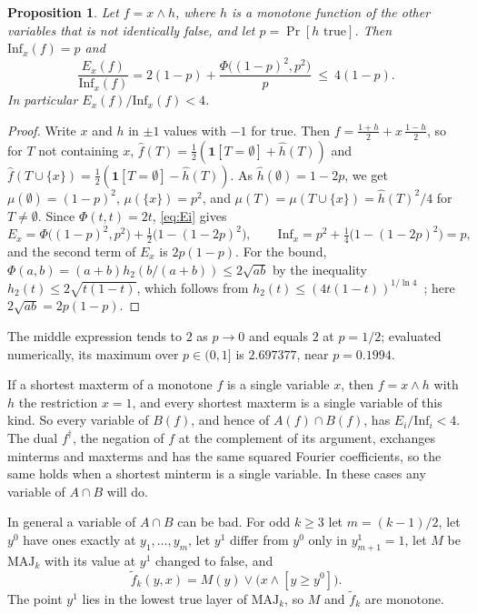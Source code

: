 \documentclass[11pt]{amsart}
\newtheorem{proposition}[theorem]{Proposition}
\theoremstyle{remark}
\newcommand{\Inf}{\mathrm{Inf}}
\newcommand{\MAJ}{\mathrm{MAJ}}
\begin{document}
\begin{proposition}\label{prop:xand}
Let $f=x\wedge h$, where $h$ is a monotone function of the other variables that is not identically false, and let
$p=\Pr[h\text{ true}]$. Then $\Inf_x(f)=p$ and
\[
\frac{E_x(f)}{\Inf_x(f)}=2(1-p)+\frac{\Phi\bigl((1-p)^2,p^2\bigr)}{p}\ \le\ 4(1-p).
\]
In particular $E_x(f)/\Inf_x(f)<4$.
\end{proposition}

\begin{proof}
Write $x$ and $h$ in $\pm1$ values with $-1$ for true. Then $f=\frac{1+h}2+x\,\frac{1-h}2$, so for $T$ not containing
$x$, $\hat f(T)=\frac12(\mathbf 1[T=\emptyset]+\hat h(T))$ and $\hat f(T\cup\{x\})=\frac12(\mathbf
1[T=\emptyset]-\hat h(T))$. As $\hat h(\emptyset)=1-2p$, we get $\mu(\emptyset)=(1-p)^2$, $\mu(\{x\})=p^2$, and
$\mu(T)=\mu(T\cup\{x\})=\hat h(T)^2/4$ for $T\ne\emptyset$. Since $\Phi(t,t)=2t$, \eqref{eq:Ei} gives
\[
E_x=\Phi\bigl((1-p)^2,p^2\bigr)+\tfrac12\bigl(1-(1-2p)^2\bigr),\qquad \Inf_x=p^2+\tfrac14\bigl(1-(1-2p)^2\bigr)=p,
\]
and the second term of $E_x$ is $2p(1-p)$. For the bound, $\Phi(a,b)=(a+b)h_2(b/(a+b))\le2\sqrt{ab}$ by the
inequality $h_2(t)\le2\sqrt{t(1-t)}$, which follows from $h_2(t)\le(4t(1-t))^{1/\ln4}$~\cite{Top}; here
$2\sqrt{ab}=2p(1-p)$.
\end{proof}

The middle expression tends to $2$ as $p\to0$ and equals $2$ at $p=1/2$; evaluated numerically, its maximum over
$p\in(0,1]$ is $2.697377$, near $p=0.1994$.

If a shortest maxterm of a monotone $f$ is a single variable $x$, then $f=x\wedge h$ with $h$ the restriction $x=1$,
and every shortest maxterm is a single variable of this kind. So every variable of $B(f)$, and hence of $A(f)\cap B(f)$,
has $E_i/\Inf_i<4$. The dual $f^\dagger$, the negation of $f$ at the complement of its argument, exchanges minterms and maxterms and has the same
squared Fourier coefficients, so the same holds when a shortest minterm is a single variable. In these cases any
variable of $A\cap B$ will do.

In general a variable of $A\cap B$ can be bad. For odd $k\ge3$ let $m=(k-1)/2$, let $y^0$ have ones exactly at $y_1,\dots,y_m$, let $y^1$ differ from $y^0$ only in $y^1_{m+1}=1$, let $M$ be $\MAJ_k$ with its value at $y^1$ changed to false, and
\[
\tilde f_k(y,x)=M(y)\vee\bigl(x\wedge[y\ge y^0]\bigr).
\]
The point $y^1$ lies in the lowest true layer of $\MAJ_k$, so $M$ and $\tilde f_k$ are monotone.
\end{document}
